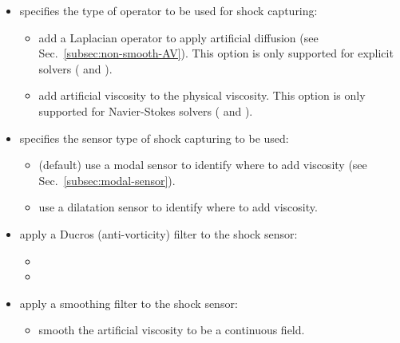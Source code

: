 \begin{itemize}
    \begin{itemize}
      \item {} (default option to solve the unsteady equations).
      \item {} (uses the Selective Frequency Damping method
        (see Sec. \ref{SectionSFD}) to obtain a steady-state solution of the
        Navier-Stokes equations (explicit or implicit)).
    \end{itemize}
  \item {} specifies the type of operator to be used for shock capturing:
    \begin{itemize}
      \item {} add a Laplacian operator to apply artificial diffusion (see Sec.~\ref{subsec:non-smooth-AV}). 
        This option is only supported for explicit solvers ( and ).
      \item {} add artificial viscosity to the physical viscosity.
        This option is only supported for Navier-Stokes solvers ( and ).
    \end{itemize}
  \item {} specifies the sensor type of shock capturing to be used:
    \begin{itemize}
      \item {} (default) use a modal sensor to identify where to add viscosity (see Sec.~\ref{subsec:modal-sensor}).
      \item {} use a dilatation sensor to identify where to add viscosity.
    \end{itemize}
  \item {} apply a Ducros \cite{ducros1999large} (anti-vorticity) filter to the shock sensor:
    \begin{itemize}
      \item {}
      \item {}
    \end{itemize}
  \item {} apply a smoothing filter to the shock sensor:
    \begin{itemize}
      \item {} smooth the artificial viscosity to be a continuous field.
    \end{itemize}
\end{itemize}

